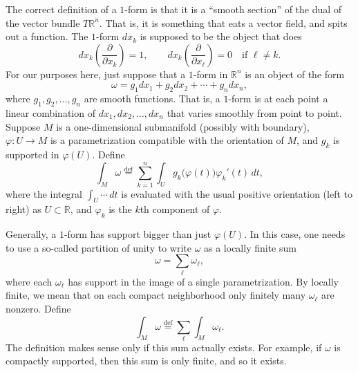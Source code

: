 \documentclass[12pt,openany]{book}
\newcommand{\R}{{\mathbb{R}}}
\theoremstyle{plain}
\theoremstyle{remark}
\theoremstyle{definition}
\theoremstyle{exercise}
\theoremstyle{example}
\begin{document}
The correct definition of a $1$-form is that it is a ``smooth section'' of
the dual of the vector bundle $T \R^n$.  That is, it is something that eats
a vector field, and spits out a function.  The $1$-form
$dx_k$ is supposed to be the object that does
\begin{equation*}
dx_k\left(
\frac{\partial}{\partial x_k}
\right)
=
1,
\qquad
dx_k\left(
\frac{\partial}{\partial x_\ell}
\right)
=
0 \quad \text{if $\ell\not=k$}.
\end{equation*}
For our purposes here, just suppose that a $1$-form
in $\R^n$ is an object of the form
\begin{equation*}
\omega = g_1 dx_1 + g_2 dx_2 + \cdots + g_n dx_n ,
\end{equation*}
where $g_1, g_2, \ldots, g_n$ are smooth functions.  That is, a $1$-form is
at each point a linear combination of $dx_1, dx_2, \ldots, dx_n$ that
varies smoothly from point to point.
Suppose $M$ is a one-dimensional submanifold
(possibly with boundary), $\varphi \colon U \to M$
is a parametrization compatible with the orientation of $M$,
and $g_k$ is supported in $\varphi(U)$.
Define
\begin{equation*}
\int_M \omega
\overset{\text{def}}{=}
\sum_{k=1}^n
\int_U g_k\bigl( \varphi(t) \bigr) \varphi_k'(t) \, dt ,
\end{equation*}
where the integral $\int_U \cdots \, dt$
is evaluated with the usual positive orientation
(left to right) as $U \subset \R$, and $\varphi_k$ is the $k$th component
of $\varphi$.

Generally, a $1$-form has support bigger than just $\varphi(U)$.  In this
case, one needs to use a so-called partition of unity to write $\omega$
as a locally finite sum
\begin{equation*}
\omega = \sum_{\ell} \omega_\ell ,
\end{equation*}
where each $\omega_\ell$ has support in the image of a single
parametrization.  By locally finite, we mean that on each compact
neighborhood only finitely many $\omega_\ell$ are nonzero.
Define
\begin{equation*}
\int_M \omega
\overset{\text{def}}{=}
\sum_{\ell}
\int_M \omega_\ell .
\end{equation*}
The definition makes sense only
if this sum actually exists.  For example, if $\omega$ is
compactly supported, then this sum is only finite, and so it exists.
\end{document}
